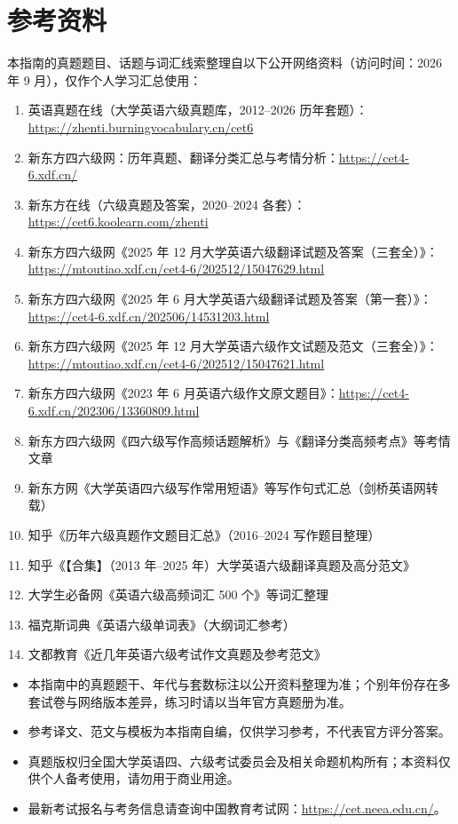 \section{参考资料}
\label{sec:references}

本指南的真题题目、话题与词汇线索整理自以下公开网络资料（访问时间：2026 年 9 月），仅作个人学习汇总使用：

\begin{enumerate}
  \item 英语真题在线（大学英语六级真题库，2012--2026 历年套题）：\url{https://zhenti.burningvocabulary.cn/cet6}
  \item 新东方四六级网：历年真题、翻译分类汇总与考情分析：\url{https://cet4-6.xdf.cn/}
  \item 新东方在线（六级真题及答案，2020--2024 各套）：\url{https://cet6.koolearn.com/zhenti}
  \item 新东方四六级网《2025 年 12 月大学英语六级翻译试题及答案（三套全）》：\url{https://mtoutiao.xdf.cn/cet4-6/202512/15047629.html}
  \item 新东方四六级网《2025 年 6 月大学英语六级翻译试题及答案（第一套）》：\url{https://cet4-6.xdf.cn/202506/14531203.html}
  \item 新东方四六级网《2025 年 12 月大学英语六级作文试题及范文（三套全）》：\url{https://mtoutiao.xdf.cn/cet4-6/202512/15047621.html}
  \item 新东方四六级网《2023 年 6 月英语六级作文原文题目》：\url{https://cet4-6.xdf.cn/202306/13360809.html}
  \item 新东方四六级网《四六级写作高频话题解析》与《翻译分类高频考点》等考情文章
  \item 新东方网《大学英语四六级写作常用短语》等写作句式汇总（剑桥英语网转载）
  \item 知乎《历年六级真题作文题目汇总》（2016--2024 写作题目整理）
  \item 知乎《【合集】（2013 年--2025 年）大学英语六级翻译真题及高分范文》
  \item 大学生必备网《英语六级高频词汇 500 个》等词汇整理
  \item 福克斯词典《英语六级单词表》（大纲词汇参考）
  \item 文都教育《近几年英语六级考试作文真题及参考范文》
\end{enumerate}

\begin{notebox}[免责与说明]
\begin{itemize}
  \item 本指南中的真题题干、年代与套数标注以公开资料整理为准；个别年份存在多套试卷与网络版本差异，练习时请以当年官方真题册为准。
  \item 参考译文、范文与模板为本指南自编，仅供学习参考，不代表官方评分答案。
  \item 真题版权归全国大学英语四、六级考试委员会及相关命题机构所有；本资料仅供个人备考使用，请勿用于商业用途。
  \item 最新考试报名与考务信息请查询中国教育考试网：\url{https://cet.neea.edu.cn/}。
\end{itemize}
\end{notebox}
